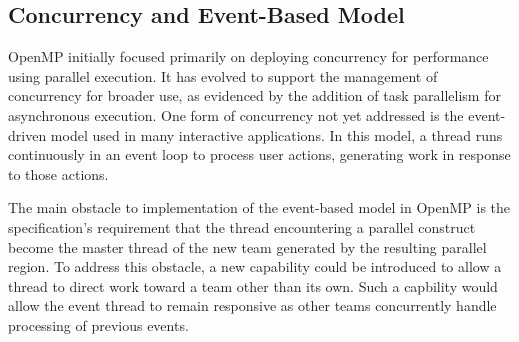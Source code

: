 \subsection{Concurrency and Event-Based Model}
\label{sub:concurrency_and_event_based_model}


OpenMP initially focused primarily on deploying concurrency for 
performance using parallel execution. It has evolved to support 
the management of concurrency for broader use, as evidenced by 
the addition of task parallelism for asynchronous execution. 
One form of concurrency not yet addressed is the event-driven 
model used in many interactive applications.  In this model, a  
thread runs continuously in an event loop to process user 
actions, generating work in response to those actions.  
 
The main obstacle to implementation of the event-based model in 
OpenMP is the specification's requirement that the thread 
encountering a parallel construct become the master thread of 
the new team generated by the resulting parallel region.  To 
address this obstacle, a new capability could be introduced to 
allow a thread to direct work toward a team other than its own. 
Such a capbility would allow the event thread to remain 
responsive as other teams concurrently handle processing of 
previous events.

